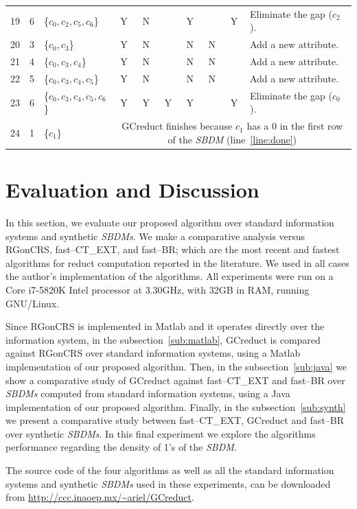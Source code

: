 \documentclass[number,preprint,review,12pt]{elsarticle}
\begin{document}
\begin{table}[!htb]
\begin{tabular}{|c|c|l|c|c|c|c|c|c|l|}
    		19 & 6 & \{$c_0,c_2,c_5,c_6$\}		& Y & N &   & Y &   & Y & Eliminate the gap ($c_2$).\\
    		20 & 3 & \{$c_0,c_3$\}				& Y & N &   & N & N &   & Add a new attribute.\\    		
    		21 & 4 & \{$c_0,c_3,c_4$\}			& Y & N &   & N & N &   & Add a new attribute.\\
    		22 & 5 & \{$c_0,c_3,c_4,c_5$\}		& Y & N &   & N & N &   & Add a new attribute.\\
    		23 & 6 & \{$c_0,c_3,c_4,c_5,c_6$\} 	& Y & Y & Y & Y &   & Y & Eliminate the gap ($c_0$).\\
    		\hline
    		24 & 1 & \{$c_1$\} 					& \multicolumn{7}{p{8cm}|}{GCreduct finishes because $c_1$ has a 0 in the first row of the \textit{SBDM} (line~\ref{line:done})}\\
    		\hline
		\end{tabular}
	\end{table}
	
%
\section{Evaluation and Discussion}\label{evaluation}
	In this section, we evaluate our proposed algorithm over standard information systems \citep{Bache13} and synthetic \textit{SBDMs}. We make a comparative analysis versus RGonCRS, fast--CT\_EXT, and fast--BR; which are the most recent and fastest algorithms for reduct computation reported in the literature. We used in all cases the author's implementation of the algorithms. All experiments were run on a Core i7-5820K Intel processor at 3.30GHz, with 32GB in RAM, running GNU/Linux.
	
	Since RGonCRS is implemented in Matlab and it operates directly	over the information system, in the subsection~\ref{sub:matlab}, GCreduct is compared against RGonCRS over standard information systems, using a Matlab implementation of our proposed algorithm. Then, in the subsection~\ref{sub:java} we show a comparative study of GCreduct against fast--CT\_EXT and fast--BR over \textit{SBDMs} computed from standard information systems, using a Java implementation of our proposed algorithm. Finally, in the subsection~\ref{sub:synth} we present a comparative study between fast--CT\_EXT, GCreduct and fast--BR over synthetic \textit{SBDMs}. In this final experiment we explore the algorithms performance regarding the density of 1's of the \textit{SBDM}.
	
	The source code of the four algorithms as well as all the standard information systems and synthetic \textit{SBDMs} used in these experiments, can be downloaded from \url{http://ccc.inaoep.mx/~ariel/GCreduct}.
	
\end{document}
